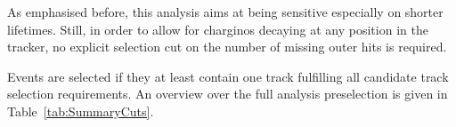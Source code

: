 As emphasised before, this analysis aims at being sensitive especially on shorter lifetimes.
Still, in order to allow for charginos decaying at any position in the tracker, no explicit selection cut on the number of missing outer hits is required.

Events are selected if they at least contain one track fulfilling all candidate track selection requirements.
An overview over the full analysis preselection is given in Table~\ref{tab:SummaryCuts}. 
\renewcommand{\arraystretch}{1.40}
\begin{table}[!h]
\vspace{5pt}
\centering
\caption{Summary and categorisation of the analysis selection.}
\label{tab:SummaryCuts}
\end{table}
